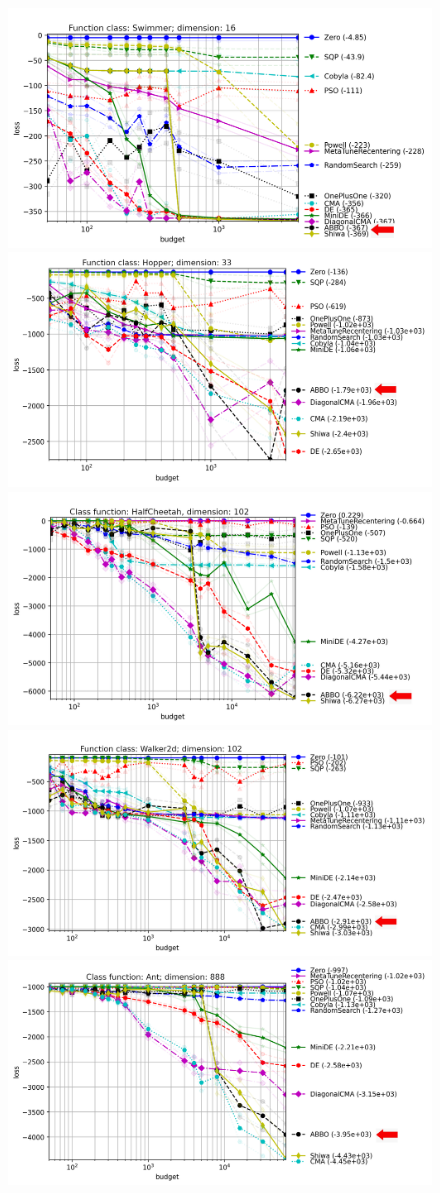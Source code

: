 \begin{figure}[t]
    \centering
    \includegraphics[width=.48\textwidth]{sections/appendix/h220benchmarks/benchmark/control_problem/xpresults_dimension16,function_classSwimmer,parametrizationsigma=0.1_edited.png}
    \includegraphics[width=.48\textwidth]{sections/appendix/h220benchmarks/benchmark/control_problem/xpresults_dimension33,function_classHopper,parametrizationsigma=0.1_edited.png}\\
    \includegraphics[width=.48\textwidth]{sections/appendix/h220benchmarks/benchmark/control_problem/xpresults_dimension102,function_classHalfCheetah,parametrizationsigma=0.1_edited.png}
    \includegraphics[width=.48\textwidth]{sections/appendix/h220benchmarks/benchmark/control_problem/xpresults_dimension102,function_classWalker2d,parametrizationsigma=0.1_edited.png}\\
        \includegraphics[width=.48\textwidth]{sections/appendix/h220benchmarks/benchmark/control_problem/xpresults_dimension888,function_classAnt,parametrizationsigma=0.01_edited.png}

\end{figure}

